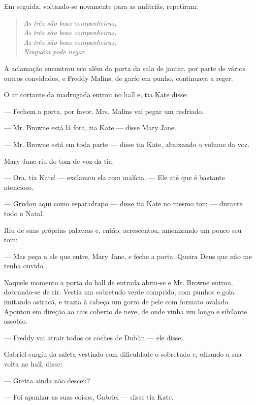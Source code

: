 Em seguida, voltando-se novamente para as anfitriãs, repetiram:

\begin{verse}{\itshape
As três são boas companheiras,\\
As três são boas companheiras,\\
As três são boas companheiras,\\
Ninguém pode negar.}
\end{verse}

A aclamação encontrou eco além da porta da sala de jantar, por parte de
vários outros convidados, e Freddy Malins, de garfo em punho,
continuava a reger.

\dotfill\hspace{.7\textwidth}

O ar cortante da madrugada entrou no hall e, tia Kate disse:

--- Fechem a porta, por favor. Mrs. Malins vai pegar um resfriado.

--- Mr. Browne está lá fora, tia Kate --- disse Mary Jane.

--- Mr. Browne está em toda parte --- disse tia Kate, abaixando o volume
da voz.

Mary Jane riu do tom de voz da tia.

--- Ora, tia Kate! --- exclamou ela com malícia. --- Ele até que é
bastante atencioso.

--- Grudou aqui como esparadrapo --- disse tia Kate no mesmo tom ---
durante todo o Natal.

Riu de suas próprias palavras e, então, acrescentou, amenizando um
pouco seu tom:

--- Mas peça a ele que entre, Mary Jane, e feche a porta. Queira Deus
que não me tenha ouvido.

Naquele momento a porta do hall de entrada abriu-se e Mr. Browne
entrou, dobrando-se de rir. Vestia um sobretudo verde comprido, com
punhos e gola imitando astracã, e trazia à cabeça um gorro de pele com
formato ovalado. Apontou em direção ao cais coberto de neve, de onde
vinha um longo e sibilante assobio.

--- Freddy vai atrair todos os coches de Dublin --- ele disse.

Gabriel surgiu da saleta vestindo com dificuldade o sobretudo e,
olhando a sua volta no hall, disse:

--- Gretta ainda não desceu?

--- Foi apanhar as suas coisas, Gabriel --- disse tia Kate.

